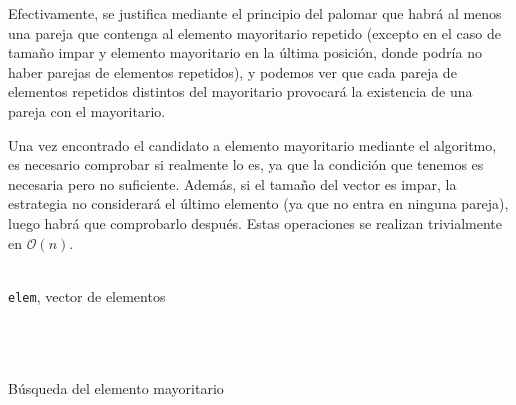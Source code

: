 \documentclass[a4paper, 11pt]{article} %
\begin{document}
Efectivamente, se justifica mediante el principio del palomar que habrá al menos una pareja que contenga al elemento mayoritario
repetido (excepto en el caso de tamaño impar y elemento mayoritario en la última posición, donde podría no haber parejas de elementos 
repetidos), y podemos ver que cada pareja de elementos repetidos distintos del mayoritario provocará la existencia de una pareja con el mayoritario.

Una vez encontrado el candidato a elemento mayoritario mediante el algoritmo, es necesario comprobar si realmente lo es, ya que la 
condición que tenemos es necesaria pero no suficiente. Además, si el tamaño del vector es impar, la estrategia no considerará el 
último elemento (ya que no entra en ninguna pareja), luego habrá que comprobarlo después. Estas operaciones se realizan trivialmente en $\mathcal{O}(n)$.

\begin{algorithm}[H]
	\begin{algorithmic}[1]
		\REQUIRE \ \\
        	\texttt{elem}, vector de elementos\\\
    	 		\RETURN{\texttt{elem[0]}} 
     		\ELSE
     		\ENDIF 
     	\ENDIF\\\
	    	\IF{\texttt{p} == \texttt{q}}
		 		\STATE{Añadir \texttt{p} a \texttt{repet}}
	     	\ENDIF
     	\ENDFOR \\\
     	\ELSE
     		\ELSE
     			\RETURN{\texttt{NULO}}
     		\ENDIF
    	\ENDIF
	\end{algorithmic}
    \caption{Búsqueda del elemento mayoritario}
    \label{mayoritario}
\end{algorithm}
\end{document}

